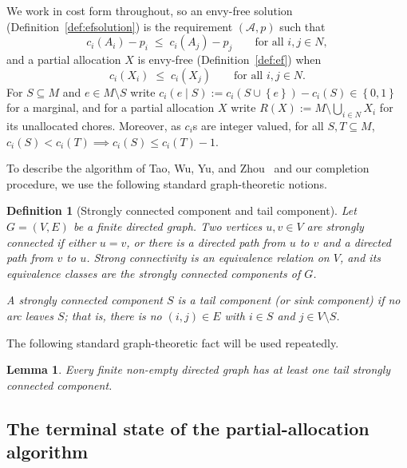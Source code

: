 \documentclass[sigconf,anonymous]{aamas}
\newcommand{\agents}{N}
\newcommand{\items}{M}
\newcommand{\bundle}[1]{A_{#1}}
\newcommand{\subsidy}{p}
\newcommand{\cost}{c}
\newcommand{\set}[1]{\left\{#1\right\}}
\theoremstyle{acmplain}
\newtheorem{lemma}[theorem]{Lemma}
\theoremstyle{acmdefinition}
\newtheorem{definition}[theorem]{Definition}
\theoremstyle{acmplain}
\begin{document}
We work in cost form throughout, so an envy-free solution (Definition~\ref{def:efsolution}) is the requirement $(\mathcal{A},p)$ such that
\begin{equation} \label{eq:m-ef}
  \cost_i(\bundle i) - \subsidy_i \;\le\; \cost_i(\bundle j) - \subsidy_j  \qquad \text{for all } i,j \in \agents ,
\end{equation} 
and a partial allocation $X$ is envy-free (Definition~\ref{def:ef}) when
\begin{equation} \label{eq:m-pef}
  \cost_i(X_i) \;\le\; \cost_i(X_j)
  \qquad \text{for all } i,j \in \agents .
\end{equation}
For $S \subseteq \items$ and $e \in \items \setminus S$ write $\cost_i(e \mid S) := \cost_i(S \cup \set e) - \cost_i(S) \in \set{0,1}$ for a marginal, and for a partial allocation $X$ write $R(X) := \items \setminus \bigcup_{i \in \agents} X_i$ for its unallocated chores.  Moreover, as $\cost_i$s are integer valued, for all $S,T\subseteq M$, \(\cost_i(S) < \cost_i(T) \implies \cost_i(S) \le \cost_i(T) - 1 .
 \)

To describe the algorithm of Tao, Wu, Yu, and Zhou~\cite{tao2025existence} and our completion procedure, we use the following standard graph-theoretic notions.

\begin{definition}[Strongly connected component and tail component]
\label{def:scc}
Let $G=(V,E)$ be a finite directed graph. Two vertices \(u,v\in V\) are \emph{strongly connected} if either \(u=v\), or there is a directed path from \(u\) to \(v\) and a directed path from \(v\) to \(u\). Strong connectivity is an equivalence relation on $V$, and its equivalence classes are the \emph{strongly connected components} of $G$.

A strongly connected component $S$ is a \emph{tail component} (or \emph{sink component}) if no arc leaves $S$; that is, there is no $(i,j)\in E$ with $i\in S$ and $j\in V\setminus S$.
\end{definition}

The following standard graph-theoretic fact will be used repeatedly.

\begin{lemma} \label{lem:tail-scc-exists} Every finite non-empty directed graph has at least one tail strongly connected component.
\end{lemma}



\subsection{The terminal state of the partial-allocation algorithm}
\label{sec:m-terminal}
\end{document}
